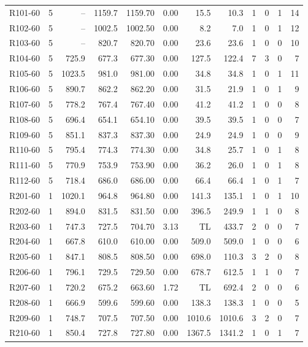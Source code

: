 \documentclass[10pt]{article}
\begin{document}
\begin{table}[p]
\begin{tabular}{lrrrrrrrrrrr}
\midrule
R101-60 & 5 & -- & 1159.7 & 1159.70 & 0.00 & 15.5 & 10.3 & 1 & 0 & 1 & 14 \\
R102-60 & 5 & -- & 1002.5 & 1002.50 & 0.00 & 8.2 & 7.0 & 1 & 0 & 1 & 12 \\
R103-60 & 5 & -- & 820.7 & 820.70 & 0.00 & 23.6 & 23.6 & 1 & 0 & 0 & 10 \\
R104-60 & 5 & 725.9 & 677.3 & 677.30 & 0.00 & 127.5 & 122.4 & 7 & 3 & 0 & 7 \\
R105-60 & 5 & 1023.5 & 981.0 & 981.00 & 0.00 & 34.8 & 34.8 & 1 & 0 & 1 & 11 \\
R106-60 & 5 & 890.7 & 862.2 & 862.20 & 0.00 & 31.5 & 21.9 & 1 & 0 & 1 & 9 \\
R107-60 & 5 & 778.2 & 767.4 & 767.40 & 0.00 & 41.2 & 41.2 & 1 & 0 & 0 & 8 \\
R108-60 & 5 & 696.4 & 654.1 & 654.10 & 0.00 & 39.5 & 39.5 & 1 & 0 & 0 & 7 \\
R109-60 & 5 & 851.1 & 837.3 & 837.30 & 0.00 & 24.9 & 24.9 & 1 & 0 & 0 & 9 \\
R110-60 & 5 & 795.4 & 774.3 & 774.30 & 0.00 & 34.8 & 25.7 & 1 & 0 & 1 & 8 \\
R111-60 & 5 & 770.9 & 753.9 & 753.90 & 0.00 & 36.2 & 26.0 & 1 & 0 & 1 & 8 \\
R112-60 & 5 & 718.4 & 686.0 & 686.00 & 0.00 & 66.4 & 66.4 & 1 & 0 & 1 & 7 \\
\midrule
R201-60 & 1 & 1020.1 & 964.8 & 964.80 & 0.00 & 141.3 & 135.1 & 1 & 0 & 1 & 10 \\
R202-60 & 1 & 894.0 & 831.5 & 831.50 & 0.00 & 396.5 & 249.9 & 1 & 1 & 0 & 8 \\
R203-60 & 1 & 747.3 & 727.5 & 704.70 & 3.13 & TL & 433.7 & 2 & 0 & 0 & 7 \\
R204-60 & 1 & 667.8 & 610.0 & 610.00 & 0.00 & 509.0 & 509.0 & 1 & 0 & 0 & 6 \\
R205-60 & 1 & 847.1 & 808.5 & 808.50 & 0.00 & 698.0 & 110.3 & 3 & 2 & 0 & 8 \\
R206-60 & 1 & 796.1 & 729.5 & 729.50 & 0.00 & 678.7 & 612.5 & 1 & 1 & 0 & 7 \\
R207-60 & 1 & 720.2 & 675.2 & 663.60 & 1.72 & TL & 692.4 & 2 & 0 & 0 & 6 \\
R208-60 & 1 & 666.9 & 599.6 & 599.60 & 0.00 & 138.3 & 138.3 & 1 & 0 & 0 & 5 \\
R209-60 & 1 & 748.7 & 707.5 & 707.50 & 0.00 & 1010.6 & 1010.6 & 3 & 2 & 0 & 7 \\
R210-60 & 1 & 850.4 & 727.8 & 727.80 & 0.00 & 1367.5 & 1341.2 & 1 & 0 & 1 & 7 \\

\end{tabular}
\end{table}
\end{document}
